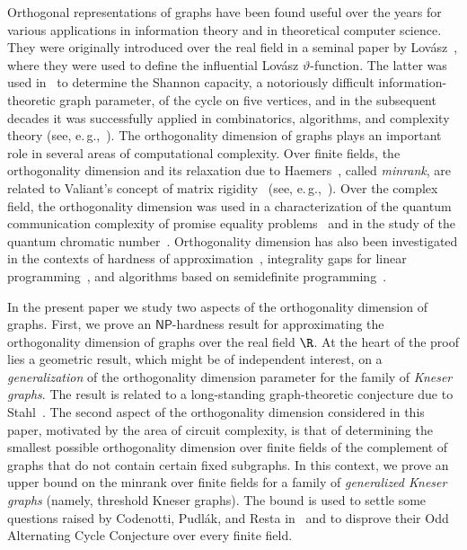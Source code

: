 \documentclass{toc}
\newcommand{\NP}{\mathsf{NP}}
\begin{document}
Orthogonal representations of graphs have been found useful over the years for various applications in information theory and in theoretical computer science.
They were originally introduced over the real field in a seminal
%
paper by  %
Lov\'asz~\cite{Lovasz79}, where they were used to define the influential Lov\'asz $\vartheta$-function. The latter was used in~\cite{Lovasz79} to determine the Shannon capacity, a notoriously difficult information-theoretic graph parameter, of the cycle on five vertices, and in the
%
subsequent decades  %
%
%
it was successfully applied in combinatorics, algorithms, and complexity theory (see, e.\,g.,~\cite{Tardos88,knuth1994sandwich,Feige97,AlonK98}).
%
%
%
The orthogonality dimension of graphs plays an important role in several areas of computational complexity.
Over finite fields, the orthogonality dimension and its
%
%
%
relaxation due to Haemers~\cite{Haemers79, Haemers81}, %
%
%
called \emph{minrank},  %
%
%
%
are related to Valiant's concept of matrix rigidity~\cite{Valiant77} (see, e.\,g.,~\cite{CodenottiPR00,Riis07,GolovnevRW17}).
Over the complex field, the orthogonality dimension was used in a characterization of the quantum communication complexity of promise equality problems~\cite{deWolfThesis,BrietBLPS15,BrietZ17} and in the study of the quantum chromatic number~\cite{CameronMNSW07,ScarpaS12}.
%
Orthogonality dimension   %
%
has also been %
investigated in the contexts of hardness of approximation~\cite{Peeters96,LangbergS08}, integrality gaps for linear programming~\cite{HuTS17,Haviv18topo}, and algorithms based on %
semidefinite  %
programming~\cite{ChlamtacH14,HavivMFCS19}.

%
In the present paper we study %
two aspects of the orthogonality dimension of graphs.
First, we prove an $\NP$-hardness result for approximating the orthogonality dimension of graphs over the real field $\R$.
At the heart of the proof lies a geometric result, which might be of independent interest, on a \emph{generalization}
of the orthogonality dimension parameter for the family of \emph{Kneser graphs}. The result is related to a long-standing graph-theoretic conjecture due to Stahl~\cite{Stahl76}.
The second aspect of the orthogonality dimension
%
%
considered in this %
paper,  %
motivated by the area of circuit complexity, is that of determining the smallest possible orthogonality dimension  over finite fields of the complement of graphs that do not contain certain fixed subgraphs. In this context, we prove %
an upper bound  %
on the minrank
%
%
over finite fields for 
%
%
a family of \emph{generalized Kneser graphs} (namely, threshold Kneser graphs).
The bound is used to settle %
some %
questions raised by Codenotti, Pudl{\'{a}}k, and Resta in~\cite{CodenottiPR00}
and to disprove their Odd Alternating Cycle Conjecture over every finite field.
\end{document}
